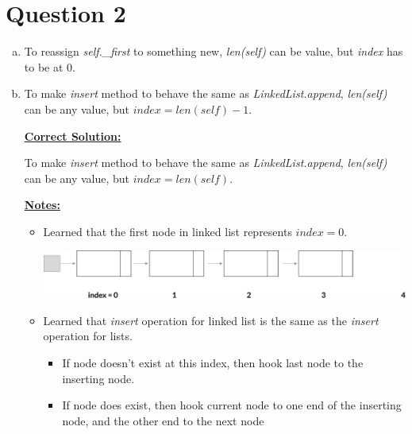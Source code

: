 \documentclass[12pt]{article}
\begin{document}
\section*{Question 2}
\begin{enumerate}[a.]
    \item To reassign \textit{self.\_first} to something new, \textit{len(self)}
    can be value, but \textit{index} has to be at 0.

    \item To make \textit{insert} method to behave the same as \textit{LinkedList.append},
    \textit{len(self)} can be any value, but $index = len(self) - 1$.

    \bigskip

    \begin{mdframed}
        \underline{\textbf{Correct Solution:}}

        \bigskip

        To make \textit{insert} method to behave the same as \textit{LinkedList.append},
        \textit{len(self)} can be any value, but \color{red}$index = len(self)$\color{black}.
    \end{mdframed}

    \bigskip

    \underline{\textbf{Notes:}}

    \bigskip

    \begin{itemize}
        \item

        Learned that the first node in linked list represents $index = 0$.

        \begin{center}
        \includegraphics[width=\linewidth]{images/worksheet_12_q1b_note_1.png}
        \end{center}

        \item Learned that \textit{insert} operation for linked list is the same as
        the \textit{insert} operation for lists.

        \begin{itemize}
            \item If node doesn't exist at this index, then hook last node to the inserting node.
            \item If node does exist, then hook current node to one end of the
            inserting node, and the other end to the next node
        \end{itemize}
    \end{itemize}
\end{enumerate}
\end{document}
